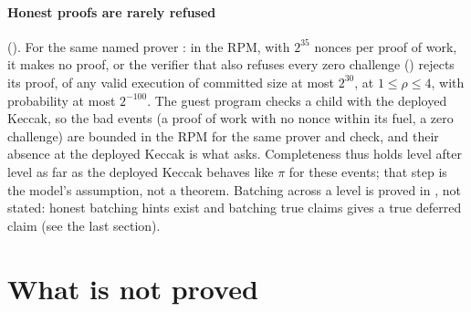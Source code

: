 \documentclass[11pt]{article}
\begin{document}
\paragraph{Honest proofs are rarely refused} (). For the same named
prover : in the RPM, with $2^{35}$ nonces per proof of work, it
makes no proof, or the verifier that also refuses every zero challenge
() rejects its proof, of any valid execution
of committed size at most $2^{30}$, at $1 \le \rho \le 4$, with probability at most $2^{-100}$. The
guest program checks a child with the deployed Keccak, so the bad events (a proof of work with no
nonce within its fuel, a zero challenge) are bounded in the
RPM for the same prover and check, and their absence at the deployed Keccak is what
 asks. Completeness thus holds level after level as far as the deployed Keccak
behaves like $\pi$ for these events; that step is the model's assumption, not a theorem. Batching
across a level is proved in , not stated: honest batching hints exist and batching
true claims gives a true deferred claim (see the last section).

\section{What is not proved}
\end{document}
